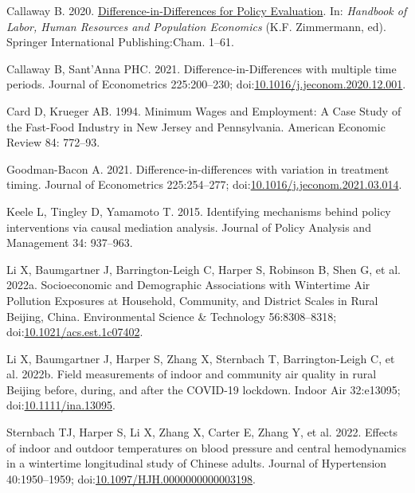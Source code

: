 \documentclass[
  letterpaper,
  DIV=11,
  numbers=noendperiod]{scrartcl}
\newlength{\cslhangindent}
\newlength{\cslentryspacingunit} %
\newenvironment{CSLReferences}[2] %
 {%
  \setlength{\parindent}{0pt}
  \ifodd #1
  \let\oldpar\par
  \def\par{\hangindent=\cslhangindent\oldpar}
  \fi
  \setlength{\parskip}{#2\cslentryspacingunit}
 }%
 {}
\begin{document}
\hypertarget{refs}{}
\begin{CSLReferences}{1}{0}
\leavevmode{}%
Callaway B. 2020.
\href{https://doi.org/10.1007/978-3-319-57365-6_352-1}{Difference-in-{Differences}
for {Policy Evaluation}}. In: \emph{Handbook of {Labor}, {Human
Resources} and {Population Economics}} (K.F. Zimmermann, ed). {Springer
International Publishing}:{Cham}. 1--61.

\leavevmode{}%
Callaway B, Sant'Anna PHC. 2021. Difference-in-{Differences} with
multiple time periods. Journal of Econometrics 225:200--230;
doi:\href{https://doi.org/10.1016/j.jeconom.2020.12.001}{10.1016/j.jeconom.2020.12.001}.

\leavevmode{}%
Card D, Krueger AB. 1994. Minimum {Wages} and {Employment}: {A Case
Study} of the {Fast-Food Industry} in {New Jersey} and {Pennsylvania}.
American Economic Review 84: 772--93.

\leavevmode{}%
Goodman-Bacon A. 2021. Difference-in-differences with variation in
treatment timing. Journal of Econometrics 225:254--277;
doi:\href{https://doi.org/10.1016/j.jeconom.2021.03.014}{10.1016/j.jeconom.2021.03.014}.

\leavevmode{}%
Keele L, Tingley D, Yamamoto T. 2015. Identifying mechanisms behind
policy interventions via causal mediation analysis. Journal of Policy
Analysis and Management 34: 937--963.

\leavevmode{}%
Li X, Baumgartner J, Barrington-Leigh C, Harper S, Robinson B, Shen G,
et al. 2022a. Socioeconomic and {Demographic Associations} with
{Wintertime Air Pollution Exposures} at {Household}, {Community}, and
{District Scales} in {Rural Beijing}, {China}. Environmental Science \&
Technology 56:8308--8318;
doi:\href{https://doi.org/10.1021/acs.est.1c07402}{10.1021/acs.est.1c07402}.

\leavevmode{}%
Li X, Baumgartner J, Harper S, Zhang X, Sternbach T, Barrington-Leigh C,
et al. 2022b. Field measurements of indoor and community air quality in
rural {Beijing} before, during, and after the {COVID-19} lockdown.
Indoor Air 32:e13095;
doi:\href{https://doi.org/10.1111/ina.13095}{10.1111/ina.13095}.

\leavevmode{}%
Sternbach TJ, Harper S, Li X, Zhang X, Carter E, Zhang Y, et al. 2022.
Effects of indoor and outdoor temperatures on blood pressure and central
hemodynamics in a wintertime longitudinal study of {Chinese} adults.
Journal of Hypertension 40:1950--1959;
doi:\href{https://doi.org/10.1097/HJH.0000000000003198}{10.1097/HJH.0000000000003198}.

\end{CSLReferences}
\end{document}
